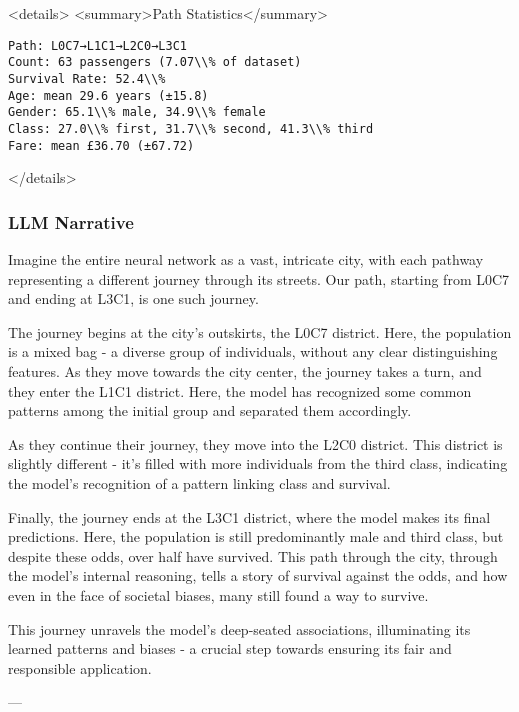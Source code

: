 <details>
<summary>Path Statistics</summary>

\begin{verbatim}
Path: L0C7→L1C1→L2C0→L3C1
Count: 63 passengers (7.07\\% of dataset)
Survival Rate: 52.4\\%
Age: mean 29.6 years (±15.8)
Gender: 65.1\\% male, 34.9\\% female
Class: 27.0\\% first, 31.7\\% second, 41.3\\% third
Fare: mean £36.70 (±67.72)
\end{verbatim}
</details>

\subsubsection*{LLM Narrative}

Imagine the entire neural network as a vast, intricate city, with each pathway representing a different journey through its streets. Our path, starting from L0C7 and ending at L3C1, is one such journey.

The journey begins at the city's outskirts, the L0C7 district. Here, the population is a mixed bag - a diverse group of individuals, without any clear distinguishing features. As they move towards the city center, the journey takes a turn, and they enter the L1C1 district. Here, the model has recognized some common patterns among the initial group and separated them accordingly.

As they continue their journey, they move into the L2C0 district. This district is slightly different - it's filled with more individuals from the third class, indicating the model's recognition of a pattern linking class and survival. 

Finally, the journey ends at the L3C1 district, where the model makes its final predictions. Here, the population is still predominantly male and third class, but despite these odds, over half have survived. This path through the city, through the model's internal reasoning, tells a story of survival against the odds, and how even in the face of societal biases, many still found a way to survive. 

This journey unravels the model's deep-seated associations, illuminating its learned patterns and biases - a crucial step towards ensuring its fair and responsible application.

---